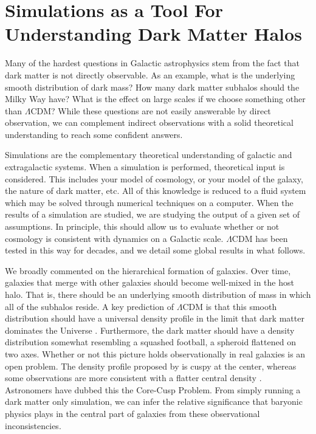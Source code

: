 
\section{Simulations as a Tool For Understanding Dark Matter Halos}

Many of the hardest questions in Galactic astrophysics stem from the fact that dark matter is not directly observable. As an example, what is the underlying smooth distribution of dark mass? How many dark matter subhalos should the Milky Way have? What is the effect on large scales if we choose something other than $\Lambda$CDM? While these questions are not easily answerable by direct observation, we can complement indirect observations with a solid theoretical understanding to reach some confident answers.

Simulations are the complementary theoretical understanding of galactic and extragalactic systems. When a simulation is performed, theoretical input is considered. This includes your model of cosmology, or your model of the galaxy, the nature of dark matter, etc. All of this knowledge is reduced to a fluid system which may be solved through numerical techniques on a computer.  When the results of a simulation are studied, we are studying the output of a given set of assumptions. In principle, this should allow us to evaluate whether or not cosmology is consistent with dynamics on a Galactic scale. $\Lambda$CDM has been tested in this way for decades, and we detail some global results in what follows.

We broadly commented on the hierarchical formation of galaxies. Over time, galaxies that merge with other galaxies should become well-mixed in the host halo. That is, there should be an underlying smooth distribution of mass in which all of the subhalos reside. A key prediction of $\Lambda$CDM is that this smooth distribution should have a universal density profile in the limit that dark matter dominates the Universe \citep{nfw}. Furthermore, the dark matter should have a density distribution somewhat resembling a squashed football, a spheroid flattened on two axes. Whether or not this picture holds observationally in real galaxies is an open problem. The density profile proposed by \citet{nfw} is cuspy at the center, whereas some observations are more consistent with a flatter central density \citep{de_block_core_cusp}. Astronomers have dubbed this the Core-Cusp Problem. From simply running a dark matter only simulation, we can infer the relative significance that baryonic physics plays in the central part of galaxies from these observational inconsistencies.

